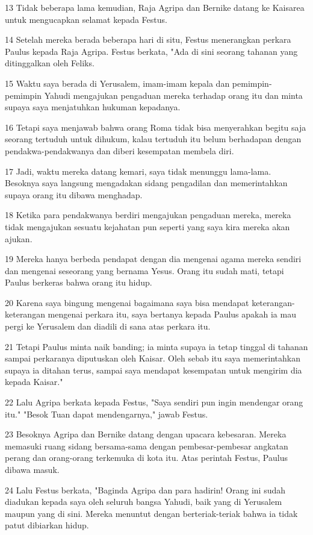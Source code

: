 \par 13 Tidak beberapa lama kemudian, Raja Agripa dan Bernike datang ke Kaisarea untuk mengucapkan selamat kepada Festus.
\par 14 Setelah mereka berada beberapa hari di situ, Festus menerangkan perkara Paulus kepada Raja Agripa. Festus berkata, "Ada di sini seorang tahanan yang ditinggalkan oleh Feliks.
\par 15 Waktu saya berada di Yerusalem, imam-imam kepala dan pemimpin-pemimpin Yahudi mengajukan pengaduan mereka terhadap orang itu dan minta supaya saya menjatuhkan hukuman kepadanya.
\par 16 Tetapi saya menjawab bahwa orang Roma tidak bisa menyerahkan begitu saja seorang tertuduh untuk dihukum, kalau tertuduh itu belum berhadapan dengan pendakwa-pendakwanya dan diberi kesempatan membela diri.
\par 17 Jadi, waktu mereka datang kemari, saya tidak menunggu lama-lama. Besoknya saya langsung mengadakan sidang pengadilan dan memerintahkan supaya orang itu dibawa menghadap.
\par 18 Ketika para pendakwanya berdiri mengajukan pengaduan mereka, mereka tidak mengajukan sesuatu kejahatan pun seperti yang saya kira mereka akan ajukan.
\par 19 Mereka hanya berbeda pendapat dengan dia mengenai agama mereka sendiri dan mengenai seseorang yang bernama Yesus. Orang itu sudah mati, tetapi Paulus berkeras bahwa orang itu hidup.
\par 20 Karena saya bingung mengenai bagaimana saya bisa mendapat keterangan-keterangan mengenai perkara itu, saya bertanya kepada Paulus apakah ia mau pergi ke Yerusalem dan diadili di sana atas perkara itu.
\par 21 Tetapi Paulus minta naik banding; ia minta supaya ia tetap tinggal di tahanan sampai perkaranya diputuskan oleh Kaisar. Oleh sebab itu saya memerintahkan supaya ia ditahan terus, sampai saya mendapat kesempatan untuk mengirim dia kepada Kaisar."
\par 22 Lalu Agripa berkata kepada Festus, "Saya sendiri pun ingin mendengar orang itu." "Besok Tuan dapat mendengarnya," jawab Festus.
\par 23 Besoknya Agripa dan Bernike datang dengan upacara kebesaran. Mereka memasuki ruang sidang bersama-sama dengan pembesar-pembesar angkatan perang dan orang-orang terkemuka di kota itu. Atas perintah Festus, Paulus dibawa masuk.
\par 24 Lalu Festus berkata, "Baginda Agripa dan para hadirin! Orang ini sudah diadukan kepada saya oleh seluruh bangsa Yahudi, baik yang di Yerusalem maupun yang di sini. Mereka menuntut dengan berteriak-teriak bahwa ia tidak patut dibiarkan hidup.
